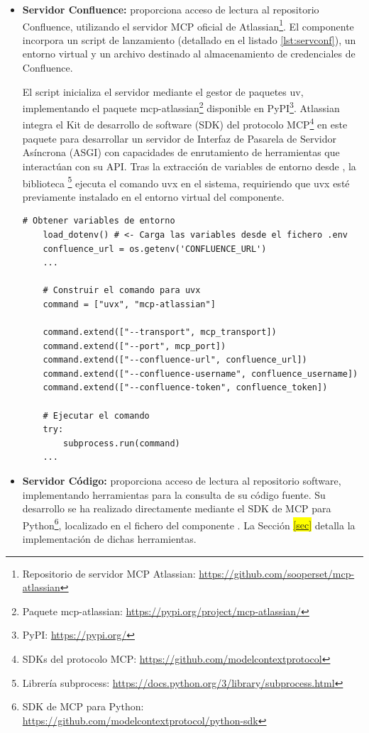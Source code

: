 \begin{itemize}
  \item \textbf{Servidor Confluence:} proporciona acceso de lectura al repositorio Confluence, utilizando el servidor MCP oficial de Atlassian\footnote{Repositorio de servidor MCP Atlassian: \url{https://github.com/sooperset/mcp-atlassian}}. El componente  incorpora un script de lanzamiento  (detallado en el listado \ref{lst:servconf}), un entorno virtual  y un archivo  destinado al almacenamiento de credenciales de Confluence.

    El script inicializa el servidor mediante el gestor de paquetes uv, implementando el paquete mcp-atlassian\footnote{Paquete mcp-atlassian: \url{https://pypi.org/project/mcp-atlassian/}} disponible en PyPI\footnote{PyPI: \url{https://pypi.org/}}. Atlassian integra el Kit de desarrollo de software (SDK) del protocolo MCP\footnote{SDKs del protocolo MCP: \url{https://github.com/modelcontextprotocol}} en este paquete para desarrollar un servidor de Interfaz de Pasarela de Servidor Asíncrona (ASGI) con capacidades de enrutamiento de herramientas que interactúan con su API. Tras la extracción de variables de entorno desde , la biblioteca \footnote{Librería subprocess: \url{https://docs.python.org/3/library/subprocess.html}} ejecuta el comando uvx en el sistema, requiriendo que uvx esté previamente instalado en el entorno virtual del componente.
    \begin{lstlisting}[caption={\protect\opus{launch_mcp_server_confluence.py}: ejecución de lanzamiento del servidor MCP Confluence},label={lst:servconf}]
    # Obtener variables de entorno
    load_dotenv() # <- Carga las variables desde el fichero .env
    confluence_url = os.getenv('CONFLUENCE_URL')
    ...

    # Construir el comando para uvx
    command = ["uvx", "mcp-atlassian"]
    
    command.extend(["--transport", mcp_transport])
    command.extend(["--port", mcp_port]) 
    command.extend(["--confluence-url", confluence_url])
    command.extend(["--confluence-username", confluence_username])
    command.extend(["--confluence-token", confluence_token])

    # Ejecutar el comando
    try:
        subprocess.run(command)
    ...
\end{lstlisting}

\item\textbf{Servidor Código: }proporciona acceso de lectura al repositorio software, implementando herramientas para la consulta de su código fuente. Su desarrollo se ha realizado directamente mediante el SDK de MCP para Python\footnote{SDK de MCP para Python: \url{https://github.com/modelcontextprotocol/python-sdk}}, localizado en el fichero  del componente . La Sección \colorbox{yellow}{\ref{sec}} detalla la implementación de dichas herramientas.


\end{itemize}
